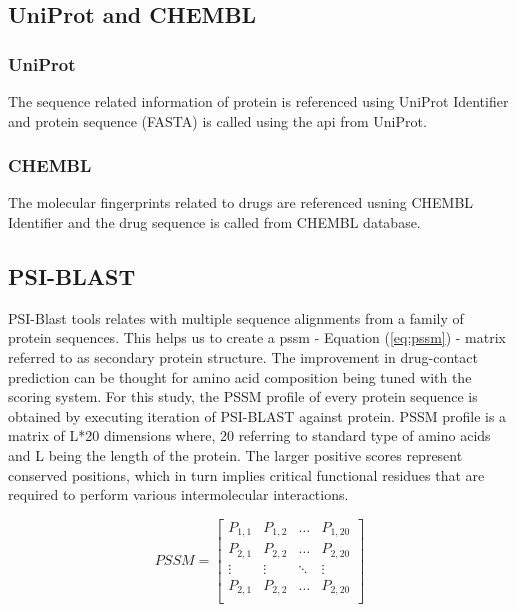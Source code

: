   \subsection{UniProt and CHEMBL }
  
  \subsubsection{UniProt} 
  The sequence related information of protein is referenced using UniProt Identifier and protein sequence (FASTA) is called using the api from UniProt. \cite{UniProtConsortium2018}
  
  
  \subsubsection{CHEMBL}
  The molecular fingerprints related to drugs are referenced usning CHEMBL Identifier and the drug sequence is called from CHEMBL database. \cite{Gaulton2017}
  
  \subsection{PSI-BLAST}
  PSI-Blast tools relates with multiple sequence alignments from a family of protein sequences\cite{Schaffer2001}. This helps us to create a \acrshort{pssm} - Equation (\ref{eq:pssm}) - matrix referred to as secondary protein structure. The improvement in drug-contact prediction can be thought for amino acid composition being tuned with the scoring system. For this study, the PSSM profile of every protein sequence is obtained by executing iteration of PSI-BLAST against \cite[KEGG]{Schaffer2001} protein. PSSM profile is a matrix of L*20 dimensions where, 20 referring to standard type of amino acids and L being the length of the protein. The larger positive scores represent conserved positions, which in turn implies critical functional residues that are required to perform various intermolecular interactions.\cite[PSSM]{Schaffer2001}
  
  \begin{equation}
    PSSM = \begin{bmatrix}
      P_{1,1} & P_{1,2} & \dots & P_{1,20} \\
      P_{2,1} & P_{2,2} & \dots & P_{2,20} \\
      \vdots  & \vdots  & \ddots & \vdots \\
      P_{2,1} & P_{2,2} & \dots & P_{2,20} \\
    \end{bmatrix}
    \label{eq:pssm}
  \end{equation}
  
